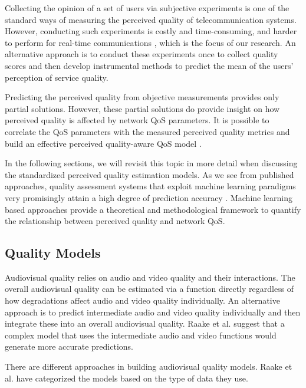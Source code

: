 \documentclass[journal]{IEEEtran}
\begin{document}
Collecting the opinion of a set of users via subjective experiments is one of the standard ways of measuring the perceived quality of telecommunication systems. However, conducting such experiments is costly and time-consuming, and harder to perform for real-time communications \cite{li2014real}, which is the focus of our research. An alternative approach is to conduct these experiments once to collect quality scores and then develop instrumental methods to predict the mean of the users' perception of service quality.

Predicting the perceived quality from objective measurements provides only partial solutions. However, these partial solutions do provide insight on how perceived quality is affected by network QoS parameters. It is possible to correlate the QoS parameters with the measured perceived quality metrics and build an effective perceived quality-aware QoS model \cite{rifai2011brief}.

In the following sections, we will revisit this topic in more detail when discussing the standardized perceived quality estimation models. As we see from published approaches, quality assessment systems that exploit machine learning paradigms very promisingly attain a high degree of prediction accuracy \cite{aroussi2014survey}. Machine learning based approaches provide a theoretical and methodological framework to quantify the relationship between perceived quality and network QoS.

\subsection{Quality Models}
\label{subsec:QualityModels}

Audiovisual quality relies on audio and video quality and their interactions. The overall audiovisual quality can be estimated via a function directly regardless of how degradations affect audio and video quality individually. An alternative approach is to predict intermediate audio and video quality individually and then integrate these into an overall audiovisual quality. Raake et al. \cite{raake2011ip} suggest that a complex model that uses the intermediate audio and video functions would generate more accurate predictions.

There are different approaches in building audiovisual quality models. Raake et al. \cite{raake2011ip} have categorized the models based on the type of data they use.
\end{document}
